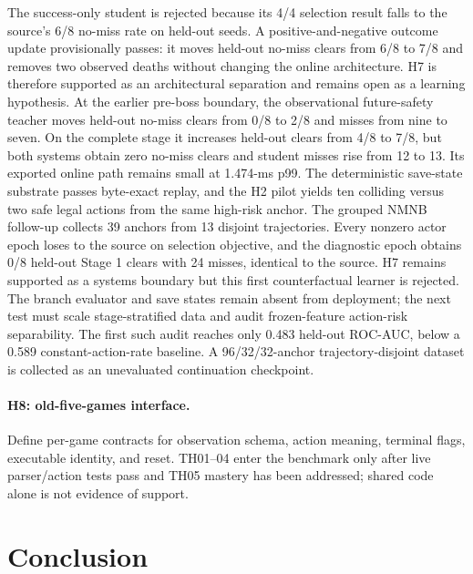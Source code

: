 \documentclass[10pt]{article}
\begin{document}
The success-only student is rejected because its 4/4 selection result falls to
the source's 6/8 no-miss rate on held-out seeds.  A positive-and-negative
outcome update provisionally passes: it moves held-out no-miss clears from 6/8
to 7/8 and removes two observed deaths without changing the online architecture.
H7 is therefore supported as an architectural separation and remains open as a
learning hypothesis.  At the earlier pre-boss boundary, the observational
future-safety teacher moves held-out no-miss clears from 0/8 to 2/8 and misses
from nine to seven.  On the complete stage it increases held-out clears from
4/8 to 7/8, but both systems obtain zero no-miss clears and student misses rise
from 12 to 13.  Its exported online path remains small at 1.474-ms p99.  The
deterministic save-state substrate passes byte-exact replay, and the H2 pilot
yields ten colliding versus two safe legal actions from the same high-risk
anchor.  The grouped NMNB follow-up collects 39 anchors from 13 disjoint
trajectories.  Every nonzero actor epoch loses to the source on selection
objective, and the diagnostic epoch obtains 0/8 held-out Stage 1 clears with
24 misses, identical to the source.  H7 remains supported as a systems
boundary but this first counterfactual learner is rejected.  The branch
evaluator and save states remain absent from deployment; the next test must
scale stage-stratified data and audit frozen-feature action-risk separability.
The first such audit reaches only 0.483 held-out ROC-AUC, below a 0.589
constant-action-rate baseline.  A 96/32/32-anchor trajectory-disjoint dataset
is collected as an unevaluated continuation checkpoint.

\paragraph{H8: old-five-games interface.}
Define per-game contracts for observation schema, action meaning, terminal
flags, executable identity, and reset.  TH01--04 enter the benchmark only after
live parser/action tests pass and TH05 mastery has been addressed; shared code
alone is not evidence of support.

\section{Conclusion}
\end{document}
